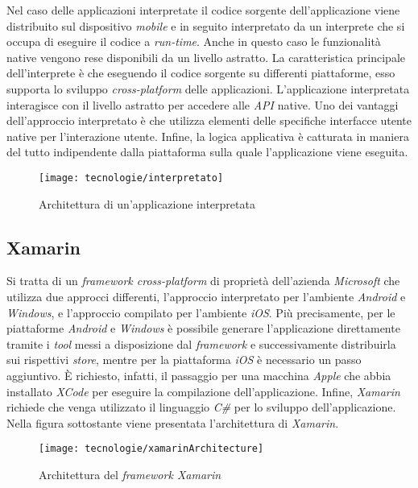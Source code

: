 Nel caso delle applicazioni interpretate il codice sorgente dell'applicazione viene distribuito sul dispositivo \textit{mobile} e in seguito interpretato da un interprete che si occupa di eseguire il codice a \textit{run-time}. Anche in questo caso le funzionalità native vengono rese disponibili da un livello astratto. La caratteristica principale dell'interprete è che eseguendo il codice sorgente su differenti piattaforme, esso supporta lo sviluppo \textit{cross-platform} delle applicazioni. L'applicazione interpretata interagisce con il livello astratto per accedere alle \textit{API} native. Uno dei vantaggi dell'approccio interpretato è che utilizza elementi delle specifiche interfacce utente native per l'interazione utente. Infine, la logica applicativa è catturata in maniera del tutto indipendente dalla piattaforma sulla quale l'applicazione viene eseguita.

\begin{figure}[!h] 
    \centering 
    \texttt{[image: tecnologie/interpretato]} 
    \caption{Architettura di un'applicazione interpretata}
\end{figure}

\newpage

\subsection{Xamarin}

Si tratta di un \textit{framework cross-platform} di proprietà dell'azienda \textit{Microsoft} che utilizza due approcci differenti, l'approccio interpretato per l'ambiente \textit{Android} e \textit{Windows}, e l'approccio compilato per l'ambiente \textit{iOS}. Più precisamente, per le piattaforme \textit{Android} e \textit{Windows} è possibile generare l'applicazione direttamente tramite i \textit{tool} messi a disposizione dal \textit{framework} e successivamente distribuirla sui rispettivi \textit{store}, mentre per la piattaforma \textit{iOS} è necessario un passo aggiuntivo. È richiesto, infatti, il passaggio per una macchina \textit{Apple} che abbia installato \textit{XCode} per eseguire la compilazione dell'applicazione. Infine, \textit{Xamarin} richiede che venga utilizzato il linguaggio \textit{C\#} per lo sviluppo dell'applicazione. Nella figura sottostante viene presentata l'architettura di \textit{Xamarin}.

\begin{figure}[!h] 
    \centering 
    \texttt{[image: tecnologie/xamarinArchitecture]} 
    \caption{Architettura del \textit{framework Xamarin}}
\end{figure}

